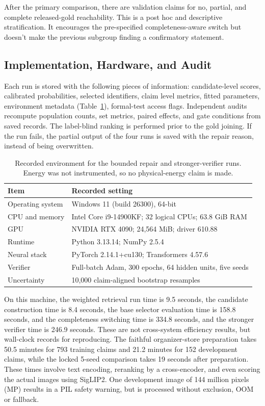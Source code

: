 After the primary comparison, there are validation claims for no, partial, and complete released-gold reachability. This is a post hoc and descriptive stratification. It encourages the pre-specified completeness-aware switch but doesn't make the previous subgroup finding a confirmatory statement.

\subsection{Implementation, Hardware, and Audit}

Each run is stored with the following pieces of information: candidate-level scores, calibrated probabilities, selected identifiers, claim level metrics, fitted parameters, environment metadata (Table~\ref{tab:environment}), formal-test access flags. Independent audits recompute population counts, set metrics, paired effects, and gate conditions from saved records. The label-blind ranking is performed prior to the gold joining. If the run fails, the partial output of the four runs is saved with the repair reason, instead of being overwritten.

\begin{table}[t]
\centering
\caption{Recorded environment for the bounded repair and stronger-verifier runs. Energy was not instrumented, so no physical-energy claim is made.}
\label{tab:environment}
\small
\setlength{\tabcolsep}{3.5pt}
\begin{tabular}{p{}p{}}
\toprule
Item & Recorded setting \\
\midrule
Operating system & Windows 11 (build 26300), 64-bit \\
CPU and memory & Intel Core i9-14900KF; 32 logical CPUs; 63.8 GiB RAM \\
GPU & NVIDIA RTX 4090; 24,564 MiB; driver 610.88 \\
Runtime & Python 3.13.14; NumPy 2.5.4 \\
Neural stack & PyTorch 2.14.1+cu130; Transformers 4.57.6 \\
Verifier & Full-batch Adam, 300 epochs, 64 hidden units, five seeds \\
Uncertainty & 10,000 claim-aligned bootstrap resamples \\
\bottomrule
\end{tabular}
\end{table}

On this machine, the weighted retrieval run time is 9.5 seconds, the candidate construction time is 8.4 seconds, the base selector evaluation time is 158.8 seconds, and the completeness switching time is 334.8 seconds, and the stronger verifier time is 246.9 seconds. These are not cross-system efficiency results, but wall-clock records for reproducing. The faithful organizer-store preparation takes 50.5 minutes for 793 training claims and 21.2 minutes for 152 development claims, while the locked 5-seed comparison takes 19 seconds after preparation. These times involve text encoding, reranking by a cross-encoder, and even scoring the actual images using SigLIP2. One development image of 144 million pixels (MP) results in a PIL safety warning, but is processed without exclusion, OOM or fallback.
